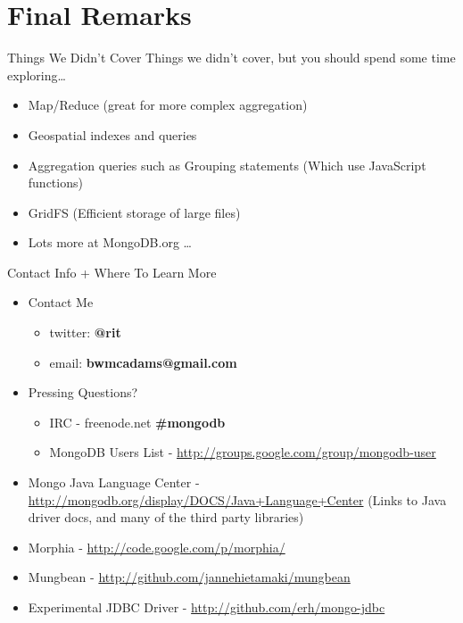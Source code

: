 \documentclass{beamer}
\begin{document}
\section{Final Remarks}
\begin{frame}{Things We Didn't Cover}
    Things we didn't cover, but you should spend some time exploring\ldots
    \begin{itemize}
        \item Map/Reduce (great for more complex aggregation)
        \item Geospatial indexes and queries
        \item Aggregation queries such as Grouping statements (Which use JavaScript functions)
        \item GridFS (Efficient storage of large files)
        \item Lots more at MongoDB.org \ldots
    \end{itemize}
\end{frame}
\begin{frame}{Contact Info + Where To Learn More}
    \begin{itemize}
        \item Contact Me
        \begin{itemize}
            \item twitter: {\bf @rit}
            \item email: {\bf bwmcadams@gmail.com}
        \end{itemize}
        \item Pressing Questions?
        \begin{itemize}
            \item IRC - {freenode.net \bf\#mongodb}
            \item MongoDB Users List - \url{http://groups.google.com/group/mongodb-user}
        \end{itemize}
    \item Mongo Java Language Center - \url{http://mongodb.org/display/DOCS/Java+Language+Center} {(\tiny Links to Java driver docs, and many of the third party libraries)}
        \item Morphia - \url{http://code.google.com/p/morphia/}
        \item Mungbean - \url{http://github.com/jannehietamaki/mungbean}
        \item Experimental JDBC Driver - \url{http://github.com/erh/mongo-jdbc}
    \end{itemize}
\end{frame}
\end{document}
